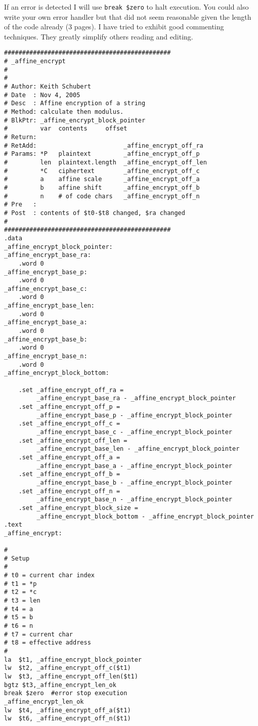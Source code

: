 If an error is detected I will use {\tt break \$zero} to halt execution.  You could also write your own error handler but that did not seem reasonable given the length of the code already (3 pages).  I have tried to exhibit good commenting techniques.  They greatly simplify others reading and editing.
\clearpage

\begin{verbatim}
##############################################
# _affine_encrypt
#
#
# Author: Keith Schubert
# Date  : Nov 4, 2005
# Desc  : Affine encryption of a string
# Method: calculate then modulus.
# BlkPtr: _affine_encrypt_block_pointer
#         var  contents     offset
# Return:
# RetAdd:                        _affine_encrypt_off_ra
# Params: *P   plaintext         _affine_encrypt_off_p
#         len  plaintext.length  _affine_encrypt_off_len
#         *C   ciphertext        _affine_encrypt_off_c
#         a    affine scale      _affine_encrypt_off_a
#         b    affine shift      _affine_encrypt_off_b
#         n    # of code chars   _affine_encrypt_off_n
# Pre   :
# Post  : contents of $t0-$t8 changed, $ra changed
#
##############################################
.data
_affine_encrypt_block_pointer:
_affine_encrypt_base_ra:
    .word 0
_affine_encrypt_base_p:
    .word 0
_affine_encrypt_base_c:
    .word 0
_affine_encrypt_base_len:
    .word 0
_affine_encrypt_base_a:
    .word 0
_affine_encrypt_base_b:
    .word 0
_affine_encrypt_base_n:
    .word 0
_affine_encrypt_block_bottom:

    .set _affine_encrypt_off_ra =
         _affine_encrypt_base_ra - _affine_encrypt_block_pointer
    .set _affine_encrypt_off_p =
         _affine_encrypt_base_p - _affine_encrypt_block_pointer
    .set _affine_encrypt_off_c =
         _affine_encrypt_base_c - _affine_encrypt_block_pointer
    .set _affine_encrypt_off_len =
         _affine_encrypt_base_len - _affine_encrypt_block_pointer
    .set _affine_encrypt_off_a =
         _affine_encrypt_base_a - _affine_encrypt_block_pointer
    .set _affine_encrypt_off_b =
         _affine_encrypt_base_b - _affine_encrypt_block_pointer
    .set _affine_encrypt_off_n =
         _affine_encrypt_base_n - _affine_encrypt_block_pointer
    .set _affine_encrypt_block_size =
         _affine_encrypt_block_bottom - _affine_encrypt_block_pointer
.text
_affine_encrypt:

#
# Setup
#
# t0 = current char index
# t1 = *p
# t2 = *c
# t3 = len
# t4 = a
# t5 = b
# t6 = n
# t7 = current char
# t8 = effective address
#
la  $t1, _affine_encrypt_block_pointer
lw  $t2, _affine_encrypt_off_c($t1)
lw  $t3, _affine_encrypt_off_len($t1)
bgtz $t3,_affine_encrypt_len_ok
break $zero  #error stop execution
_affine_encrypt_len_ok
lw  $t4, _affine_encrypt_off_a($t1)
lw  $t6, _affine_encrypt_off_n($t1)


\end{verbatim}
